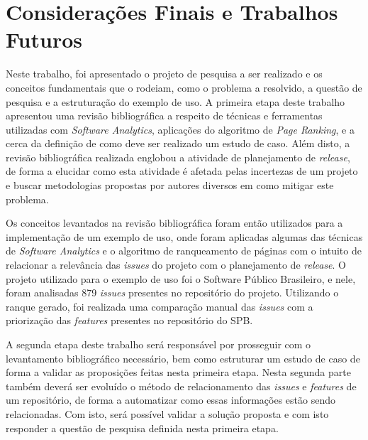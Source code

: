 \chapter{Considerações Finais e Trabalhos Futuros}

Neste trabalho, foi apresentado o projeto de pesquisa a ser realizado e os conceitos fundamentais que o rodeiam, como o problema a resolvido, a questão de pesquisa e a estruturação do exemplo de uso. A primeira etapa deste trabalho apresentou uma revisão bibliográfica a respeito de técnicas e ferramentas utilizadas com \textit{Software Analytics}, aplicações do algoritmo de \textit{Page Ranking}, e a cerca da definição de como deve ser realizado um estudo de caso. Além disto, a revisão bibliográfica realizada englobou a atividade de planejamento de \textit{release}, de forma a elucidar como esta atividade é afetada pelas incertezas de um projeto e buscar metodologias propostas por autores diversos em como mitigar este problema. 

Os conceitos levantados na revisão bibliográfica foram então utilizados para a implementação de um exemplo de uso, onde foram aplicadas algumas das técnicas de \textit{Software Analytics} e o algoritmo de ranqueamento de páginas com o intuito de relacionar a relevância das \textit{issues} do projeto com o planejamento de \textit{release}. O projeto utilizado para o exemplo de uso foi o Software Público Brasileiro, e nele, foram analisadas 879 \textit{issues} presentes no repositório do projeto. Utilizando o ranque gerado, foi realizada uma comparação manual das  \textit{issues} com a priorização das \textit{features} presentes no repositório do SPB.

A segunda etapa deste trabalho será responsável por prosseguir com o levantamento bibliográfico necessário, bem como estruturar um estudo de caso de forma a validar as proposições feitas nesta primeira etapa. Nesta segunda parte também deverá ser evoluído o método de relacionamento das \textit{issues} e \textit{features} de um repositório, de forma a automatizar como essas informações estão sendo relacionadas. Com isto, será possível validar a solução proposta e com isto responder a questão de pesquisa definida nesta primeira etapa.
